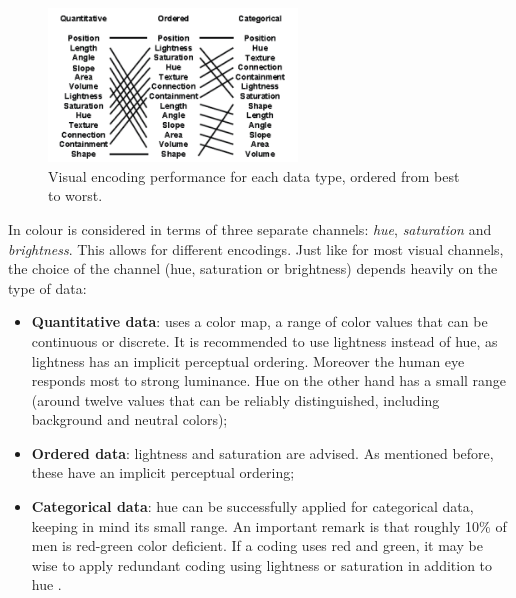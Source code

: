 \begin{figure}%
	\begin{center}
		\includegraphics[width=250px]{img/visualencodings}%
	\end{center}
	\caption{Visual encoding performance for each data type, ordered from best to worst.}%
	\label{figure:encodings}%
\end{figure}



In \cite{shirley:2009} colour is considered in terms of three separate channels: \emph{hue}, \emph{saturation} and \emph{brightness}. This allows for different encodings. Just like for most visual channels, the choice of the channel (hue, saturation or brightness) depends heavily on the type of data:

\begin{itemize}
	\item \textbf{Quantitative data}: uses a color map, a range of color values that can be continuous or discrete. It is recommended to use lightness instead of hue, as lightness has an implicit perceptual ordering. Moreover the human eye responds most to strong luminance. Hue on the other hand has a small range (around twelve values that can be reliably distinguished, including background and neutral colors);
	\item \textbf{Ordered data}: lightness and saturation are advised. As mentioned before, these have an implicit perceptual ordering;
	\item \textbf{Categorical data}: hue can be successfully applied for categorical data, keeping in mind its small range.
An important remark is that roughly 10\% of men is red-green color deficient. If a coding uses red and green, it may be wise to apply redundant coding using lightness or saturation in addition to hue \cite{shirley:2009}.
\end{itemize}

